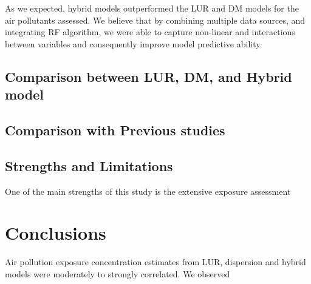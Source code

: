 \documentclass{article}
\begin{document}
As we expected, hybrid models outperformed the LUR and DM models for the air pollutants assessed. We believe that by combining multiple data sources, and integrating RF algorithm, we were able to capture non-linear and interactions between variables and consequently improve model predictive ability. 

\subsection{Comparison between LUR, DM, and Hybrid model}

\subsection{Comparison with Previous studies}

\subsection{Strengths and Limitations}
One of the main strengths of this study is the extensive exposure assessment 

\section{Conclusions}

Air pollution exposure concentration estimates from LUR, dispersion and hybrid models were moderately to strongly correlated. We observed 



































\newpage


\end{document}
